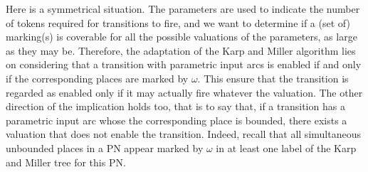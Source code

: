 Here is a symmetrical situation.
The parameters are used to indicate the number of tokens required for transitions to fire, and we want to determine if a (set of) marking(s) is coverable for all the possible valuations of the parameters, as large as they may be.
Therefore, the adaptation of the Karp and Miller algorithm lies on considering that a transition with parametric input arcs is enabled if and only if the corresponding places are marked by $\omega$.
This ensure that the transition is regarded as enabled only if it may actually fire whatever the valuation.
The other direction of the implication holds too, that is to say that, if a transition has a parametric input arc whose the corresponding place is bounded, there exists a valuation that does not enable the transition.
Indeed, recall that all simultaneous unbounded places in a \ac{PN} appear marked by $\omega$ in at least one label of the Karp and Miller tree for this \ac{PN}.

